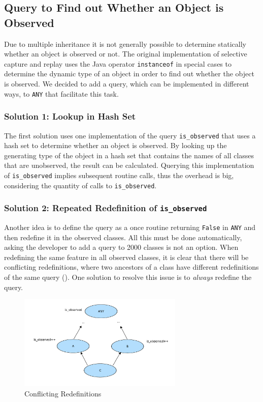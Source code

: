 \subsection{Query to Find out Whether an Object is Observed}
Due to multiple inheritance it is not generally possible to determine statically whether an object is observed or not. The original implementation of selective capture and replay uses the Java operator \texttt{instanceof} in special cases to determine the dynamic type of an object in order to find out whether the object is observed. We decided to add a query, which can be implemented in different ways, to \texttt{ANY} that facilitate this task. 

\subsubsection{Solution 1: Lookup in Hash Set}
The first solution uses one implementation of the query \texttt{is\_observed} that uses a hash set to determine whether an object is observed. By looking up the generating type of the object in a hash set that contains the names of all classes that are unobserved, the result can be calculated. Querying this implementation of \texttt{is\_observed} implies subsequent routine calls, thus the overhead is big, considering the quantity of calls to \texttt{is\_observed}.

\subsubsection{Solution 2: Repeated Redefinition of \texttt{is\_observed}}
Another idea is to define the query as a once routine returning \texttt{False} in \texttt{ANY} and then redefine it in the observed classes. All this must be done automatically, asking the developer to add a query to 2000 classes is not an option. When redefining the same feature in all observed classes, it is clear that there will be conflicting redefinitions, where two ancestors of a class have different redefinitions of the same query \cite{oosc2} (). One solution to resolve this issue is to \emph{always} redefine the query.

\begin{figure}[ht]
  \centering
  \includegraphics[width=0.7\textwidth]{illustrations/observed_query_conflicting_redefinitions}
  \caption{Conflicting Redefinitions}
  \label{fig:observed_query_conflicting_redefinitions}
\end{figure}

